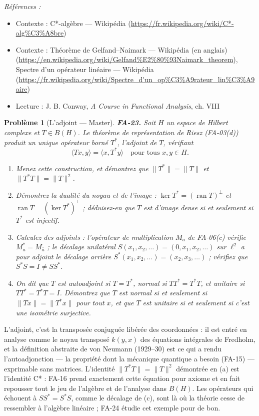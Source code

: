 \documentclass[11pt]{article}
\newtheorem{problem}{Problème}
\newenvironment{refs}{\par\small\noindent\emph{Références :}\begin{itemize}\setlength\itemsep{0pt}}{\end{itemize}\normalsize}
\begin{document}
\begin{refs}
\item Contexte : C*-algèbre --- Wikipédia (\url{https://fr.wikipedia.org/wiki/C*-alg%C3%A8bre})
\item Contexte : Théorème de Gelfand--Naimark --- Wikipédia (en anglais) (\url{https://en.wikipedia.org/wiki/Gelfand%E2%80%93Naimark_theorem}), Spectre d'un opérateur linéaire --- Wikipédia (\url{https://fr.wikipedia.org/wiki/Spectre_d'un_op%C3%A9rateur_lin%C3%A9aire})
\item Lecture : J. B. Conway, \textit{A Course in Functional Analysis}, ch. VIII
\end{refs}

\bigskip

\begin{problem}[{L'adjoint --- Master}]
\textbf{FA-23.} Soit $ H $ un espace de Hilbert complexe et $ T \in B(H) $. Le théorème de
représentation de Riesz (FA-03(d)) produit un unique opérateur borné $ T^{*} $, l'\textit{adjoint} de
$ T $, vérifiant
\[ \langle Tx, y\rangle = \langle x, T^{*}y\rangle \quad \text{pour tous } x, y \in H . \]
\begin{enumerate}
\item[(a)] Menez cette construction, et démontrez que $ \|T^{*}\| = \|T\| $ et
$ \|T^{*}T\| = \|T\|^{2} $.
\item[(b)] Démontrez la dualité du noyau et de l'image :
$ \ker T^{*} = (\operatorname{ran} T)^{\perp} $ et
$ \overline{\operatorname{ran} T} = (\ker T^{*})^{\perp} $ ; déduisez-en que $ T $ est d'image
dense si et seulement si $ T^{*} $ est injectif.
\item[(c)] Calculez des adjoints : l'opérateur de multiplication $ M_a $ de FA-06(c) vérifie
$ M_a^{*} = M_{\bar a} $ ; le décalage unilatéral
$ S(x_1, x_2, \dots) = (0, x_1, x_2, \dots) $ sur $ \ell^2 $ a pour adjoint le décalage arrière
$ S^{*}(x_1, x_2, \dots) = (x_2, x_3, \dots) $ ; vérifiez que
$ S^{*}S = I \ne S S^{*} $.
\item[(d)] On dit que $ T $ est \textit{autoadjoint} si $ T = T^{*} $, \textit{normal} si
$ TT^{*} = T^{*}T $, et \textit{unitaire} si $ TT^{*} = T^{*}T = I $. Démontrez que $ T $ est
normal si et seulement si $ \|Tx\| = \|T^{*}x\| $ pour tout $ x $, et que $ T $ est unitaire si
et seulement si c'est une isométrie surjective.
\end{enumerate}

\end{problem}

\noindent L'adjoint, c'est la transposée conjuguée libérée des coordonnées : il est entré en
analyse comme le \og{} noyau transposé \fg{} $ k(y,x) $ des équations intégrales de Fredholm, et la définition
abstraite de von Neumann (1929--30) est ce qui a rendu l'autoadjonction --- la propriété dont la mécanique
quantique a besoin (FA-15) --- exprimable sans matrices. L'identité $ \|T^{*}T\| = \|T\|^{2} $ démontrée
en (a) est l'identité C* : FA-16 prend exactement cette équation pour axiome et en fait repousser tout le
jeu de l'algèbre et de l'analyse dans $ B(H) $. Les opérateurs qui échouent à $ SS^{*} = S^{*}S $,
comme le décalage de (c), sont là où la théorie cesse de ressembler à l'algèbre linéaire ; FA-24 étudie
cet exemple pour de bon.
\end{document}
